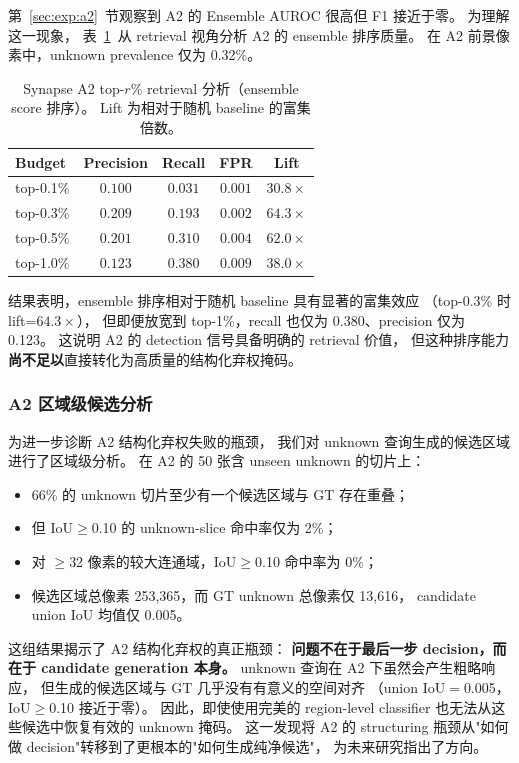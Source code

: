 \documentclass[3p,twocolumn,authoryear]{elsarticle}
\begin{document}
第~\ref{sec:exp:a2}~节观察到 A2 的 Ensemble AUROC 很高但 F1 接近于零。
为理解这一现象，
表~\ref{tab:retrieval}~从 retrieval 视角分析 A2 的 ensemble 排序质量。
在 A2 前景像素中，unknown prevalence 仅为 0.32\%。

\begin{table}[t]
\centering
\caption{Synapse A2 top-$r$\% retrieval 分析（ensemble score 排序）。
Lift 为相对于随机 baseline 的富集倍数。}\label{tab:retrieval}
\begin{tabular}{lcccc}
\toprule
Budget & Precision & Recall & FPR & Lift \\
\midrule
top-0.1\% & $0.100$ & $0.031$ & $0.001$ & $30.8\times$ \\
top-0.3\% & $0.209$ & $0.193$ & $0.002$ & $64.3\times$ \\
top-0.5\% & $0.201$ & $0.310$ & $0.004$ & $62.0\times$ \\
top-1.0\% & $0.123$ & $0.380$ & $0.009$ & $38.0\times$ \\
\bottomrule
\end{tabular}
\end{table}

结果表明，ensemble 排序相对于随机 baseline 具有显著的富集效应
（top-0.3\% 时 lift=$64.3\times$），
但即便放宽到 top-1\%，recall 也仅为 0.380、precision 仅为 0.123。
这说明 A2 的 detection 信号具备明确的 retrieval 价值，
但这种排序能力\textbf{尚不足以}直接转化为高质量的结构化弃权掩码。

\subsubsection{A2 区域级候选分析}\label{sec:exp:analysis:region}

为进一步诊断 A2 结构化弃权失败的瓶颈，
我们对 unknown 查询生成的候选区域进行了区域级分析。
在 A2 的 50 张含 unseen unknown 的切片上：

\begin{itemize}[nosep]
  \item 66\% 的 unknown 切片至少有一个候选区域与 GT 存在重叠；
  \item 但 IoU$\geq$0.10 的 unknown-slice 命中率仅为 2\%；
  \item 对 $\geq$32 像素的较大连通域，IoU$\geq$0.10 命中率为 0\%；
  \item 候选区域总像素 253,365，而 GT unknown 总像素仅 13,616，
        candidate union IoU 均值仅 0.005。
\end{itemize}

这组结果揭示了 A2 结构化弃权的真正瓶颈：
\textbf{问题不在于最后一步 decision，而在于 candidate generation 本身。}
unknown 查询在 A2 下虽然会产生粗略响应，
但生成的候选区域与 GT 几乎没有有意义的空间对齐
（union IoU$=$0.005，IoU$\geq$0.10 接近于零）。
因此，即使使用完美的 region-level classifier 也无法从这些候选中恢复有效的 unknown 掩码。
这一发现将 A2 的 structuring 瓶颈从"如何做 decision"转移到了更根本的"如何生成纯净候选"，
为未来研究指出了方向。
\end{document}
